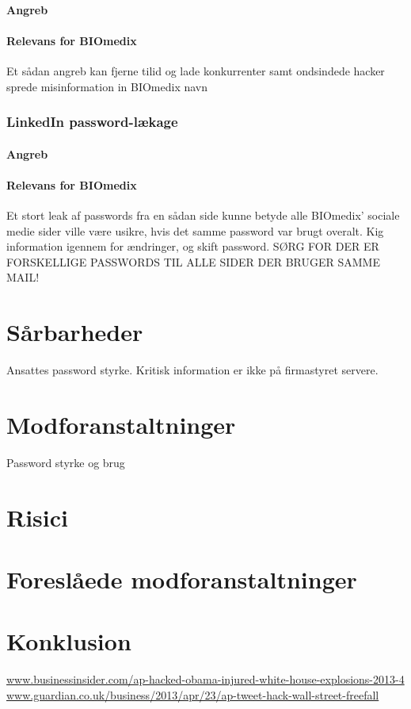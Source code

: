 \documentclass{article}
\begin{document}
\paragraph{Angreb}
 
\paragraph{Relevans for BIOmedix}

Et sådan angreb kan fjerne tilid og lade konkurrenter samt ondsindede hacker sprede misinformation in BIOmedix navn 
\subsubsection{LinkedIn password-lækage}

\paragraph{Angreb}

\paragraph{Relevans for BIOmedix}

Et stort leak af passwords fra en sådan side kunne betyde alle BIOmedix' sociale medie sider ville være usikre, hvis det samme password var brugt overalt. Kig information igennem for ændringer, og skift password. SØRG FOR DER ER FORSKELLIGE PASSWORDS TIL ALLE SIDER DER BRUGER SAMME MAIL! 

\section{Sårbarheder}

Ansattes password styrke.
Kritisk information er ikke på firmastyret servere.


\section{Modforanstaltninger}

Password styrke og brug

\section{Risici}



\section{Foreslåede modforanstaltninger}



\section{Konklusion}


\newpage
\begin{thebibliography}{100}


\url{www.businessinsider.com/ap-hacked-obama-injured-white-house-explosions-2013-4}
\url{www.guardian.co.uk/business/2013/apr/23/ap-tweet-hack-wall-street-freefall}
\end{thebibliography}
\end{document}
